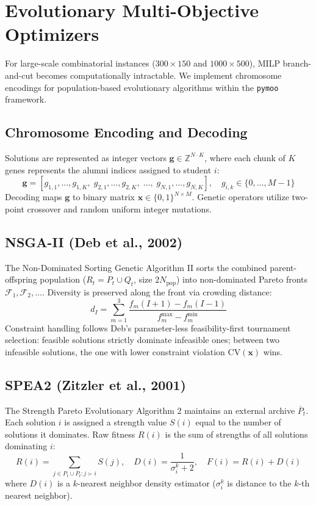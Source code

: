 \section{Evolutionary Multi-Objective Optimizers}
For large-scale combinatorial instances ($300 \times 150$ and $1000 \times 500$), MILP branch-and-cut becomes computationally intractable. We implement chromosome encodings for population-based evolutionary algorithms within the \texttt{pymoo} framework.

\subsection{Chromosome Encoding and Decoding}
Solutions are represented as integer vectors $\mathbf{g} \in \mathbb{Z}^{N \cdot K}$, where each chunk of $K$ genes represents the alumni indices assigned to student $i$:
\begin{equation}
    \mathbf{g} = \left[ g_{1,1}, \dots, g_{1,K}, \; g_{2,1}, \dots, g_{2,K}, \; \dots, \; g_{N,1}, \dots, g_{N,K} \right], \quad g_{i,k} \in \{0, \dots, M-1\}
\end{equation}
Decoding maps $\mathbf{g}$ to binary matrix $\mathbf{x} \in \{0, 1\}^{N \times M}$. Genetic operators utilize two-point crossover and random uniform integer mutations.

\subsection{NSGA-II (Deb et al., 2002)}
The Non-Dominated Sorting Genetic Algorithm II sorts the combined parent-offspring population ($R_t = P_t \cup Q_t$, size $2N_{\text{pop}}$) into non-dominated Pareto fronts $\mathcal{F}_1, \mathcal{F}_2, \dots$. Diversity is preserved along the front via crowding distance:
\begin{equation}
    d_I = \sum_{m=1}^3 \frac{f_m(I+1) - f_m(I-1)}{f_m^{\max} - f_m^{\min}}
\end{equation}
Constraint handling follows Deb's parameter-less feasibility-first tournament selection: feasible solutions strictly dominate infeasible ones; between two infeasible solutions, the one with lower constraint violation $\text{CV}(\mathbf{x})$ wins.

\subsection{SPEA2 (Zitzler et al., 2001)}
The Strength Pareto Evolutionary Algorithm 2 maintains an external archive $\overline{P}_t$. Each solution $i$ is assigned a strength value $S(i)$ equal to the number of solutions it dominates. Raw fitness $R(i)$ is the sum of strengths of all solutions dominating $i$:
\begin{equation}
    R(i) = \sum_{j \in P_t \cup \overline{P}_t : j \succ i} S(j), \quad D(i) = \frac{1}{\sigma_i^k + 2}, \quad F(i) = R(i) + D(i)
\end{equation}
where $D(i)$ is a $k$-nearest neighbor density estimator ($\sigma_i^k$ is distance to the $k$-th nearest neighbor).

